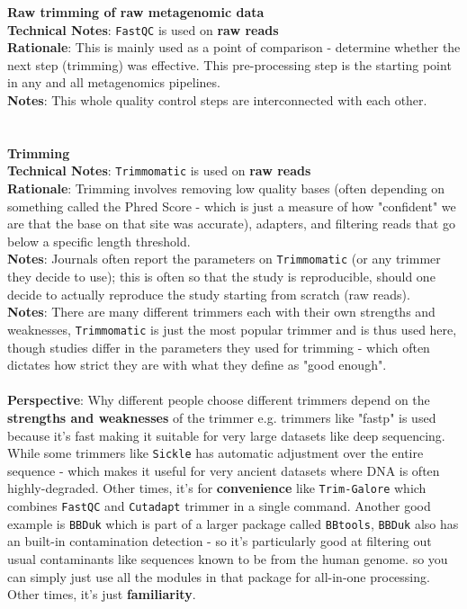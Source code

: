 \documentclass[11pt]{article}
\begin{document}
\textbf{Raw trimming of raw metagenomic data} 
\\ \textbf{Technical Notes}: \texttt{FastQC} is used on \textbf{raw reads}
\\ \textbf{Rationale}: This is mainly used as a point of comparison - determine whether the next step (trimming) was effective. This pre-processing step is the starting point in any and all metagenomics pipelines. 
\\ \textbf{Notes}: This whole quality control steps are interconnected with each other. \\
\\ 
\\
\textbf{Trimming} 
\\ \textbf{Technical Notes}: \texttt{Trimmomatic} is used on \textbf{raw reads}
\\ \textbf{Rationale}: Trimming involves removing low quality bases (often depending on something called the Phred Score - which is just a measure of how "confident" we are that the base on that site was accurate), adapters, and filtering reads that go below a specific length threshold. 
\\ \textbf{Notes}: Journals often report the parameters on \texttt{Trimmomatic} (or any trimmer they decide to use); this is often so that the study is reproducible, should one decide to actually reproduce the study starting from scratch (raw reads). 
\\ \textbf{Notes}: There are many different trimmers each with their own strengths and weaknesses, \texttt{Trimmomatic} is just the most popular trimmer and is thus used here, though studies differ in the parameters they used for trimming - which often dictates how strict they are with what they define as "good enough". \\
\\ \textbf{Perspective}: Why different people choose different trimmers depend on the \textbf{strengths and weaknesses} of the trimmer e.g. trimmers like "fastp" is used because it's fast making it suitable for very large datasets like deep sequencing. While some trimmers like \texttt{Sickle} has automatic adjustment over the entire sequence - which makes it useful for very ancient datasets where DNA is often highly-degraded. Other times, it's for \textbf{convenience} like \texttt{Trim-Galore} which combines \texttt{FastQC} and \texttt{Cutadapt} trimmer in a single command. Another good example is \texttt{BBDuk} which is part of a larger package called \texttt{BBtools}, \texttt{BBDuk} also has an built-in contamination detection - so it's particularly good at filtering out usual contaminants like sequences known to be from the human genome. so you can simply just use all the modules in that package for all-in-one processing.  Other times, it's just \textbf{familiarity}. 
\end{document}
